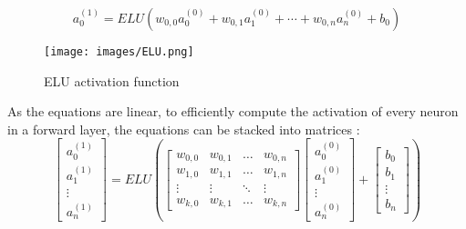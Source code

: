 \documentclass[twocolumn]{article}
\begin{document}
\begin{equation}
\label{eqn:activation}
a^{(1)}_0 = ELU(w_{0,0}a^{(0)}_0 + w_{0,1}a^{(0)}_1 + \cdots + w_{0,n}a^{(0)}_n + b_0)
\end{equation}

\begin{figure}[htbp]
\centering
\texttt{[image: images/ELU.png]}
\caption{\label{fig:ELU}ELU activation function}
\end{figure}


As the equations are linear, to efficiently compute the activation of every neuron in a forward layer, the equations can be stacked into matrices\autocite{3Blue1BrownWhatNeural} :
\begin{equation}
\begin{bmatrix} a^{(1)}_0 \\ a^{(1)}_1 \\ \vdots \\ a_n^{(1)} \end{bmatrix} = ELU \left( \begin{bmatrix}w_{0,0} & w_{0,1} & \dots & w_{0,n} \\ w_{1,0} & w_{1,1} & \dots & w_{1,n} \\ \vdots & \vdots & \ddots & \vdots \\ w_{k,0} & w_{k,1} & \dots & w_{k,n} \end{bmatrix} \begin{bmatrix} a_0^{(0)} \\ a_1^{(0)} \\ \vdots \\ a_n^{(0)} \end{bmatrix} + \begin{bmatrix} b_0 \\ b_1 \\ \vdots \\ b_n \end{bmatrix} \right)
\end{equation}
\end{document}
